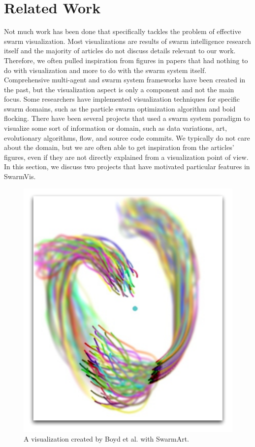 \documentclass[conference]{IEEEtran}
\begin{document}
\section{Related Work}
Not much work has been done that specifically tackles the problem of effective swarm visualization.
Most visualizations are results of swarm intelligence research itself and the majority of articles do not discuss details relevant to our work.
Therefore, we often pulled inspiration
from figures in papers that had nothing to do with visualization and more to do with the swarm system itself.
Comprehensive multi-agent and swarm system frameworks \cite{Luke}\cite{860347} have been created in the past,
but the visualization aspect is only a component and not the main focus.
Some researchers have implemented visualization techniques for specific swarm domains,
such as the particle swarm optimization algorithm\cite{Secrest} and boid flocking\cite{reynolds1987}.
There have been several projects that used a swarm system paradigm to visualize some sort of information or domain, such as 
data variations\cite{1382896}, art\cite{Boyd}, evolutionary algorithms\cite{spector2005ecb}\cite{Spector02evolutionarydynamics},
flow\cite{10.1109/TVCG.2005.87}\cite{Merzkirch}, and source code commits\cite{codeswarm:website}.
We typically do not care about the domain, but we are often able to get inspiration from the articles' figures, even if they are 
not directly explained from a visualization point of view.
In this section, we discuss two projects that have motivated particular features in SwarmVis.

\begin{figure}
\centering
\includegraphics[scale=.3]{images/SwarmArt.pdf}
\caption{A visualization created by Boyd et al. with SwarmArt\cite{Boyd}.}
\label{SwarmArt}
\end{figure}
\end{document}
